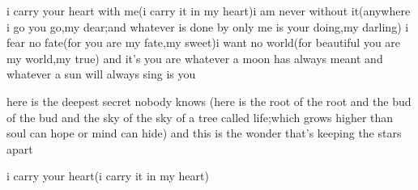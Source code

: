 i carry your heart with me(i carry it in
my heart)i am never without it(anywhere
i go you go,my dear;and whatever is done
by only me is your doing,my darling)
                                                      i fear
no fate(for you are my fate,my sweet)i want
no world(for beautiful you are my world,my true)
and it’s you are whatever a moon has always meant
and whatever a sun will always sing is you

here is the deepest secret nobody knows
(here is the root of the root and the bud of the bud
and the sky of the sky of a tree called life;which grows
higher than soul can hope or mind can hide)
and this is the wonder that's keeping the stars apart

i carry your heart(i carry it in my heart)
